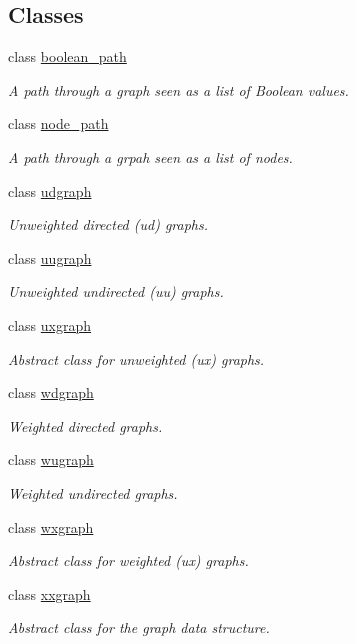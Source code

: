 \subsection*{Classes}
\begin{DoxyCompactItemize}
\item 
class \hyperlink{classlgraph_1_1boolean__path}{boolean\+\_\+path}
\begin{DoxyCompactList}\small\item\em A path through a graph seen as a list of Boolean values. \end{DoxyCompactList}\item 
class \hyperlink{classlgraph_1_1node__path}{node\+\_\+path}
\begin{DoxyCompactList}\small\item\em A path through a grpah seen as a list of nodes. \end{DoxyCompactList}\item 
class \hyperlink{classlgraph_1_1udgraph}{udgraph}
\begin{DoxyCompactList}\small\item\em Unweighted directed (ud) graphs. \end{DoxyCompactList}\item 
class \hyperlink{classlgraph_1_1uugraph}{uugraph}
\begin{DoxyCompactList}\small\item\em Unweighted undirected (uu) graphs. \end{DoxyCompactList}\item 
class \hyperlink{classlgraph_1_1uxgraph}{uxgraph}
\begin{DoxyCompactList}\small\item\em Abstract class for unweighted (ux) graphs. \end{DoxyCompactList}\item 
class \hyperlink{classlgraph_1_1wdgraph}{wdgraph}
\begin{DoxyCompactList}\small\item\em Weighted directed graphs. \end{DoxyCompactList}\item 
class \hyperlink{classlgraph_1_1wugraph}{wugraph}
\begin{DoxyCompactList}\small\item\em Weighted undirected graphs. \end{DoxyCompactList}\item 
class \hyperlink{classlgraph_1_1wxgraph}{wxgraph}
\begin{DoxyCompactList}\small\item\em Abstract class for weighted (ux) graphs. \end{DoxyCompactList}\item 
class \hyperlink{classlgraph_1_1xxgraph}{xxgraph}
\begin{DoxyCompactList}\small\item\em Abstract class for the graph data structure. \end{DoxyCompactList}\end{DoxyCompactItemize}

